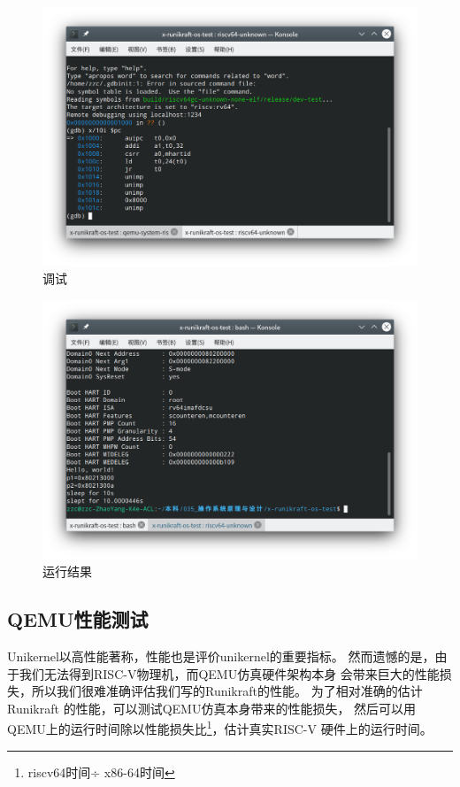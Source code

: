 \documentclass{../runikraft-report}
\begin{document}
\begin{figure}[tbh!]
\centering
\vspace*{-3ex}
\includegraphics[width=0.9\linewidth]{assets/debug.png}
\vspace*{-3ex}
\caption{调试}
\label{fig:debug}
\end{figure}

\begin{figure}[tbh!]
\centering
\vspace*{-3ex}
\includegraphics[width=0.9\linewidth]{assets/run.png}
\vspace*{-3ex}
\caption{运行结果}
\label{fig:run}
\end{figure}

\subsection{QEMU性能测试}
Unikernel以高性能著称，性能也是评价unikernel的重要指标。
然而遗憾的是，由于我们无法得到RISC-V物理机，而QEMU仿真硬件架构本身
会带来巨大的性能损失，所以我们很难准确评估我们写的Runikraft的性能。
为了相对准确的估计Runikraft
的性能，可以测试QEMU仿真本身带来的性能损失，
然后可以用QEMU上的运行时间除以性能损失比\footnote{riscv64时间÷ x86-64时间}，估计真实RISC-V
硬件上的运行时间。
\end{document}
